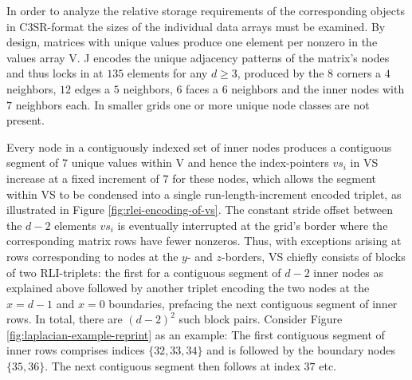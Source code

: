     In order to analyze the relative storage requirements of the corresponding objects in C3SR-format the sizes of the
    individual data arrays must be examined. By design, matrices with unique values produce one element per nonzero in
    the values array V. J encodes the unique adjacency patterns of the matrix's nodes and thus locks in at $135$ elements for
    any $d \geq 3$, produced by the $8$ corners a $4$ neighbors, $12$ edges a $5$ neighbors, $6$ faces a $6$ neighbors
    and the inner nodes with $7$ neighbors each. In smaller grids one or more unique node classes are not present.

    Every node in a contiguously indexed set of inner nodes produces a contiguous segment of $7$ unique values within V
    and hence the index-pointers $vs_i$ in VS increase at a fixed increment of $7$ for these nodes, which allows the
    segment within VS to be condensed into a single run-length-increment encoded triplet, as illustrated in Figure
    \ref{fig:rlei-encoding-of-vs}. The constant stride offset between the $d-2$ elements $vs_i$ is eventually
    interrupted at the grid's border where the corresponding matrix rows have fewer nonzeros. Thus, with exceptions
    arising at rows corresponding to nodes at the $y$- and $z$-borders, VS chiefly consists of blocks of two
    RLI-triplets: the first for a contiguous segment of $d-2$ inner nodes as explained above followed by another triplet
    encoding the two nodes at the $x=d-1$ and $x=0$ boundaries, prefacing the next contiguous segment of inner rows. In
    total, there are $(d-2)^2$ such block pairs. Consider Figure \ref{fig:laplacian-example-reprint} as an example: The
    first contiguous segment of inner rows comprises indices $\{32, 33, 34\}$ and is followed by the boundary nodes
    $\{35, 36\}$. The next contiguous segment then follows at index $37$ etc.

